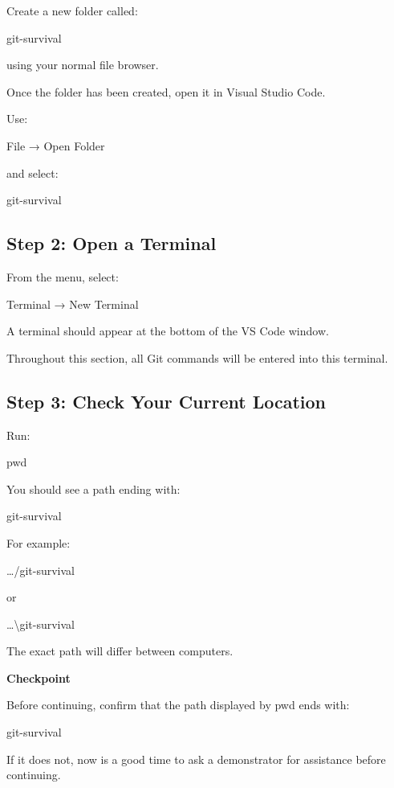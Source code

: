 \documentclass{csc2059practical}
\begin{document}
Create a new folder called:

\begin{terminalplain}
git-survival
\end{terminalplain}
using your normal file browser.

Once the folder has been created, open it in Visual Studio Code.

Use:

File → Open Folder

and select:

\begin{terminalplain}
git-survival
\end{terminalplain}
\subsection{Step 2: Open a Terminal}
From the menu, select:

Terminal → New Terminal

A terminal should appear at the bottom of the VS Code window.

Throughout this section, all Git commands will be entered into this terminal.

\subsection{Step 3: Check Your Current Location}
Run:

\begin{terminalplain}
pwd
\end{terminalplain}
You should see a path ending with:

\begin{terminalplain}
git-survival
\end{terminalplain}
For example:

\ldots{}/git-survival

or

\ldots{}\textbackslash{}git-survival

The exact path will differ between computers.

\begin{reflectionbox}
\textbf{Checkpoint}\par
\medskip

Before continuing, confirm that the path displayed by pwd ends with:


\end{reflectionbox}
\begin{terminalplain}
git-survival
\end{terminalplain}
If it does not, now is a good time to ask a demonstrator for assistance before continuing.
\end{document}
